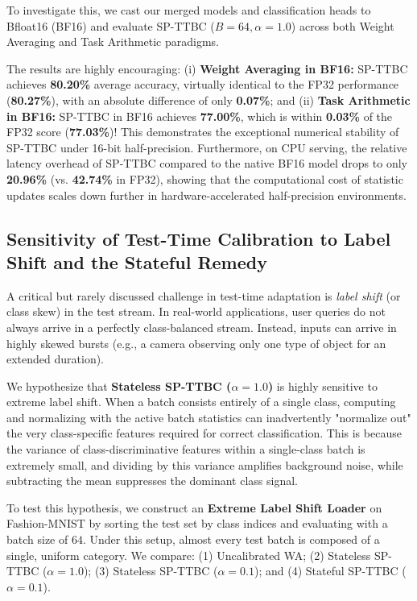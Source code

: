 \documentclass{article}
\theoremstyle{plain}
\theoremstyle{definition}
\theoremstyle{remark}
\begin{document}
To investigate this, we cast our merged models and classification heads to Bfloat16 (BF16) and evaluate SP-TTBC ($B=64, \alpha=1.0$) across both Weight Averaging and Task Arithmetic paradigms.

The results are highly encouraging: (i) \textbf{Weight Averaging in BF16:} SP-TTBC achieves \textbf{80.20\%} average accuracy, virtually identical to the FP32 performance (\textbf{80.27\%}), with an absolute difference of only \textbf{0.07\%}; and (ii) \textbf{Task Arithmetic in BF16:} SP-TTBC in BF16 achieves \textbf{77.00\%}, which is within \textbf{0.03\%} of the FP32 score (\textbf{77.03\%})! This demonstrates the exceptional numerical stability of SP-TTBC under 16-bit half-precision. Furthermore, on CPU serving, the relative latency overhead of SP-TTBC compared to the native BF16 model drops to only \textbf{20.96\%} (vs. \textbf{42.74\%} in FP32), showing that the computational cost of statistic updates scales down further in hardware-accelerated half-precision environments.

\subsection{Sensitivity of Test-Time Calibration to Label Shift and the Stateful Remedy}
\label{label_shift_sensitivity}
A critical but rarely discussed challenge in test-time adaptation is \textit{label shift} (or class skew) in the test stream. In real-world applications, user queries do not always arrive in a perfectly class-balanced stream. Instead, inputs can arrive in highly skewed bursts (e.g., a camera observing only one type of object for an extended duration). 

We hypothesize that \textbf{Stateless SP-TTBC ($\alpha=1.0$)} is highly sensitive to extreme label shift. When a batch consists entirely of a single class, computing and normalizing with the active batch statistics can inadvertently "normalize out" the very class-specific features required for correct classification. This is because the variance of class-discriminative features within a single-class batch is extremely small, and dividing by this variance amplifies background noise, while subtracting the mean suppresses the dominant class signal.

To test this hypothesis, we construct an \textbf{Extreme Label Shift Loader} on Fashion-MNIST by sorting the test set by class indices and evaluating with a batch size of $64$. Under this setup, almost every test batch is composed of a single, uniform category. We compare: (1) Uncalibrated WA; (2) Stateless SP-TTBC ($\alpha=1.0$); (3) Stateless SP-TTBC ($\alpha=0.1$); and (4) Stateful SP-TTBC ($\alpha=0.1$).
\end{document}
